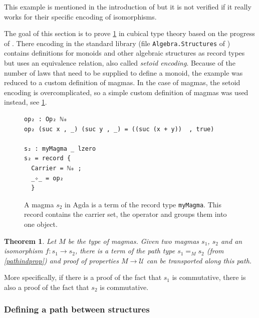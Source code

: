 \documentclass[12pt,a4paper,twoside,xetex]{book} %
\newcommand{\keyword}[1]{\emph{#1}\index{#1}}
\newtheorem{theorem}{Theorem}[section]
\begin{document}
This example is mentioned in the introduction of \cite{Coquand2013} but it is not verified if it really works for their specific encoding of isomorphisms.


The goal of this section is to prove \cref{magmatransp} in cubical type theory based on the progress of \cite{Danielsson2012}. There encoding in the standard library (file \texttt{Algebra.Structures} of \cite{Danielsson2019}) contains definitions for monoids and other algebraic 
structures as record types but uses an equivalence relation, also called \keyword{setoid encoding}. Because of the number of  laws that need to be 
supplied to define a monoid, the example was reduced to a custom definition of 
magmas. In the case of magmas, the setoid encoding is overcomplicated, so a simple custom definition of magmas was used instead, see \cref{m2def}. 

\begin{figure}\label{m2def}
\begin{center}
\begin{BVerbatim}
op₂ : Op₂ ℕ₀
op₂ (suc x , _) (suc y , _) = ((suc (x + y))  , true)

s₂ : myMagma _ lzero
s₂ = record {
  Carrier = ℕ₀ ;
  _✧_ = op₂
  }
\end{BVerbatim}
\end{center}

 \caption{A magma $s_2$ in Agda is a term of the record type \texttt{myMagma}. This record contains the carrier set, the operator and groups them into one object.}
\end{figure}

\begin{theorem}\label{magmatransp}
Let $M$ be the type of magmas. Given two magmas $s_1$, $s_2$ and an isomorphism $f : s_1 \rightarrow s_2$, there is a term of the path type $s_1 =_M s_2$ (from \cref{pathindprop}) and proof of properties $M \rightarrow \mathcal{U}$ can be transported along this path. 
\end{theorem}

More specifically, if there is a proof of the fact that $s_1$ is commutative, there is also a proof of the fact that $s_2$ is commutative. 




\subsubsection{Defining a path between structures}
\end{document}
